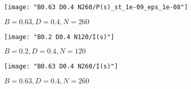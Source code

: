 \documentclass[../thesis.tex]{subfiles}
\begin{document}
\begin{figure}
  \texttt{[image: "B0.63 D0.4 N260/P(s)\_st\_1e-09\_eps\_1e-08"]}
  \caption{\(B=0.63, D=0.4, N=260\)}
\label{fig:P(s)-b0.63n260}
\end{figure}

\begin{figure}
  \texttt{[image: "B0.2 D0.4 N120/I(s)"]}
  \caption{\(B=0.2, D=0.4, N=120\)}
\label{fig:I(s)-b0.2n120}
\end{figure}

\begin{figure}
  \texttt{[image: "B0.63 D0.4 N260/I(s)"]}
  \caption{\(B=0.63, D=0.4, N=260\)}
\label{fig:I(s)-b0.63n260}
\end{figure}
\end{document}
